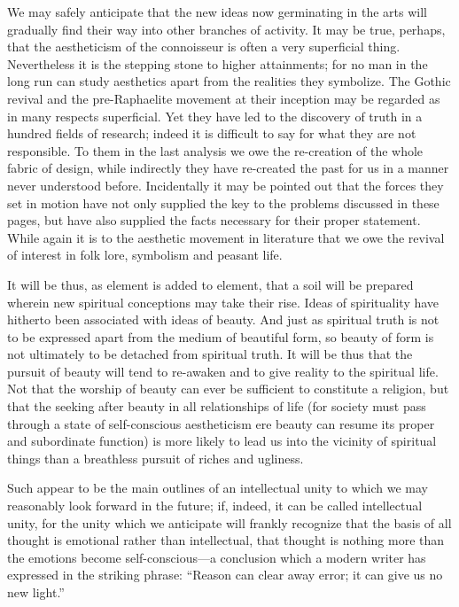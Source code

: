 \documentclass{book}
\begin{document}
We may safely anticipate that the new ideas now germinating in the arts will gradually find their way into other branches of activity. It may be true, perhaps, that the aestheticism of the connoisseur is often a very superficial thing. Nevertheless it is the stepping stone to higher attainments; for no man in the long run can study aesthetics apart from the realities they symbolize. The Gothic revival and the pre-Raphaelite movement at their inception may be regarded as in many respects superficial. Yet they have led to the discovery of truth in a hundred fields of research; indeed it is difficult to say for what they are not responsible. To them in the last analysis we owe the re-creation of the whole fabric of design, while indirectly they have re-created the past for us in a manner never understood before. Incidentally it may be pointed out that the forces they set in motion have not only supplied the key to the problems discussed in these pages, but have also supplied the facts necessary for their proper statement. While again it is to the aesthetic movement in literature that we owe the revival of interest in folk lore, symbolism and peasant life.

It will be thus, as element is added to element, that a soil will be prepared wherein new spiritual conceptions may take their rise. Ideas of spirituality have hitherto been associated with ideas of beauty. And just as spiritual truth is not to be expressed apart from the medium of beautiful form, so beauty of form is not ultimately to be detached from spiritual truth. It will be thus that the pursuit of beauty will tend to re-awaken and to give reality to the spiritual life. Not that the worship of beauty can ever be sufficient to constitute a religion, but that the seeking after beauty in all relationships of life (for society must pass through a state of self-conscious aestheticism ere beauty can resume its proper and subordinate function) is more likely to lead us into the vicinity of spiritual things than a breathless pursuit of riches and ugliness.

Such appear to be the main outlines of an intellectual unity to which we may reasonably look forward in the future; if, indeed, it can be called intellectual unity, for the unity which we anticipate will frankly recognize that the basis of all thought is emotional rather than intellectual, that thought is nothing more than the emotions become self-conscious—a conclusion which a modern writer has expressed in the striking phrase: “Reason can clear away error; it can give us no new light.”
\end{document}
